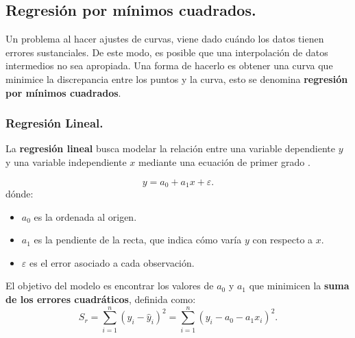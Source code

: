 \documentclass{article}
\begin{document}
\newpage
\subsection{Regresión por mínimos cuadrados.}
Un problema al hacer ajustes de curvas, viene dado cuándo los datos tienen errores sustanciales. De este modo, es posible que una interpolación de datos intermedios no sea apropiada. Una forma de hacerlo es obtener una curva que minimice la discrepancia entre los puntos y la curva, esto se denomina \textbf{regresión por mínimos cuadrados}.

\subsubsection{Regresión Lineal.}
\label{subsec:regresionlineal}
La \textbf{regresión lineal} busca modelar la relación entre una variable dependiente $y$ y una variable independiente $x$ mediante una ecuación de primer grado \cite{polinomico1, polinomico2}.

\begin{equation}
    y = a_0 + a_1 x + \varepsilon.
\end{equation}
dónde:
\begin{itemize}
    \item $a_0$ es la ordenada al origen.
    \item $a_1$ es la pendiente de la recta, que indica cómo varía $y$ con respecto a $x$.
    \item $\varepsilon$ es el error asociado a cada observación.
\end{itemize}
El objetivo del modelo es encontrar los valores de $a_0$ y $a_1$ que minimicen la \textbf{suma de los errores cuadráticos}, definida como:
$$
    S_r = \sum_{i=1}^{n} (y_i - \hat{y}_i)^2 = \sum_{i=1}^{n} (y_i - a_0 - a_1x_i)^2 .
$$
\end{document}
